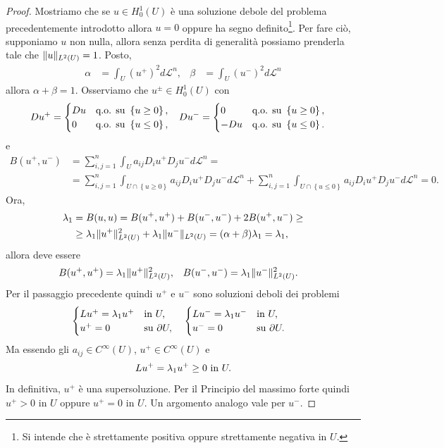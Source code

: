 \begin{proof}
	Mostriamo che se $u \in H^1_0(U)$ è una soluzione debole del problema precedentemente introdotto allora $u = 0$ oppure ha segno definito\footnote{Si intende che è strettamente positiva oppure strettamente negativa in $U$.}. Per fare ciò, supponiamo $u$ non nulla, allora senza perdita di generalità possiamo prenderla tale che $\lVert u\rVert_{L^2(U)} = 1$. Posto,
	\begin{align*}
		\alpha &= \int_{U} (u^+)^2 d\mathcal{L}^n, & \beta &= \int_{U} (u^-)^2 d\mathcal{L}^n
	\end{align*}
	allora $\alpha + \beta = 1$. Osserviamo che $u^{\pm} \in H^1_0(U)$ con 
	\begin{align*}
		Du^+ &= \begin{cases}
			Du & \textup{q.o. su } \left\lbrace u \ge 0 \right\rbrace ,\\
			0 & \textup{q.o. su } \left\lbrace u \le 0 \right\rbrace ,
		\end{cases}
		&
		Du^- &= \begin{cases}
			0 & \textup{q.o. su } \left\lbrace u \ge 0 \right\rbrace ,\\
			-Du & \textup{q.o. su } \left\lbrace u \le 0 \right\rbrace.
		\end{cases}
	\end{align*}
	e 
	\begin{align*}
		B(u^+,u^-) &= \sum_{i,j=1}^n \int_U a_{ij} D_i u^+ D_j u^- d\mathcal{L}^n = \\
		& =\sum_{i,j=1}^n \int_{U \cap \left\lbrace u \ge 0 \right\rbrace} a_{ij} D_i u^+ D_j u^- d\mathcal{L}^n + \sum_{i,j=1}^n \int_{U \cap \left\lbrace u \le 0 \right\rbrace} a_{ij} D_i u^+ D_j u^- d\mathcal{L}^n = 0.
	\end{align*}
	Ora,
	\begin{align*}
		\lambda_1 &= B(u,u) = B(u^+,u^+) + B(u^-,u^-) + 2B(u^+,u^-) \ge \\
		&\ge \lambda_1 \lVert u^+\rVert^2_{L^2(U)} + \lambda_1\lVert u^-\rVert_{L^2(U)} = (\alpha + \beta) \lambda_1 = \lambda_1,
	\end{align*}
	allora deve essere
	\begin{align*}
		B(u^+,u^+) &= \lambda_1 \lVert u^+\rVert^{2}_{L^2(U)}, & B(u^-,u^-) &= \lambda_1 \lVert u^-\rVert^{2}_{L^2(U)}.
	\end{align*}
	Per il passaggio precedente quindi $u^+$ e $u^-$ sono soluzioni deboli dei problemi
	\begin{align*}
		&\begin{cases}
			Lu^+ = \lambda_1 u^+ & \textup{in } U,\\
			u^+ = 0 & \textup{su } \partial U,
		\end{cases} & &\begin{cases}
			Lu^- = \lambda_1 u^- & \textup{in } U,\\
			u^- = 0 & \textup{su } \partial U.
		\end{cases}
	\end{align*} 
	Ma essendo gli $a_{ij} \in C^\infty(U)$, $u^+ \in C^\infty(U)$ e 
	\[ Lu^+ = \lambda_1 u^+ \ge 0 \textup{ in } U. \]
	In definitiva, $u^+$ è una supersoluzione. Per il Principio del massimo forte quindi $u^+ >0$ in $U$ oppure $u^+ = 0$ in $U$. Un argomento analogo vale per $u^-$.
	

\end{proof}
